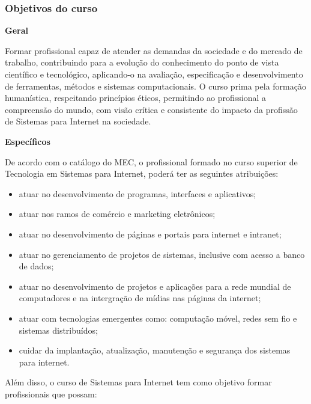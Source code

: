 
\subsubsection{Objetivos do curso}

\textbf{Geral}

\vspace{5mm}
Formar profissional capaz de atender as demandas da sociedade e do mercado de trabalho, contribuindo para a evolução do conhecimento do ponto de vista científico e tecnológico, aplicando-o na avaliação, especificação e desenvolvimento de ferramentas, métodos e sistemas computacionais. O curso prima pela formação humanística, respeitando princípios éticos, permitindo ao profissional a compreensão do mundo, com visão crítica e consistente do impacto da profissão de Sistemas para Internet na sociedade.

\vspace{5mm}
\textbf{Específicos}

\vspace{5mm}

De acordo com o cat\'alogo do MEC, o profissional formado no curso superior de Tecnologia em Sistemas para Internet, poder\'a ter as seguintes atribui\c{c}\~oes:

\begin{itemize}

\item atuar no desenvolvimento de programas, interfaces e aplicativos;
\item atuar nos ramos de com\'ercio e marketing eletr\^onicos;
\item atuar no desenvolvimento de p\'aginas e portais para internet e intranet;
\item atuar no gerenciamento de projetos de sistemas, inclusive com acesso a banco de dados;
\item atuar no desenvolvimento de projetos e aplica\c{c}\~oes para a rede mundial de computadores e na intergra\c{c}\~ao de m\'idias nas p\'aginas da internet;
\item atuar com tecnologias emergentes como: computa\c{c}\~ao m\'ovel, redes sem fio e sistemas distribu\'idos;
\item cuidar da implanta\c{c}\~ao, atualiza\c{c}\~ao, manuten\c{c}\~ao e seguran\c{c}a dos sistemas para internet.
\end{itemize}

Al\'em disso, o curso de Sistemas para Internet tem como objetivo formar profissionais que possam:

